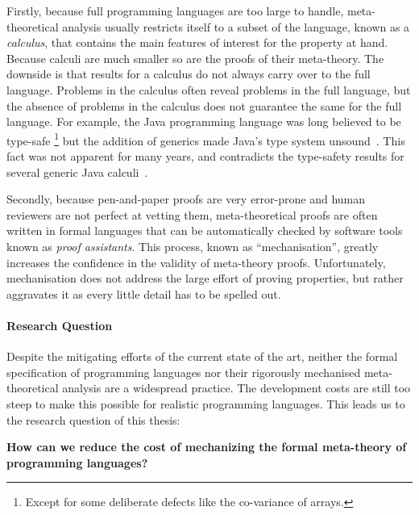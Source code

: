 {Firstly, because full programming languages are too large to handle,
meta-theoretical analysis usually restricts itself to a subset of the language, known as
a \emph{calculus}, that contains the main features of interest for the property
at hand. Because calculi are much smaller so are the proofs of their 
meta-theory. The downside is that results for a calculus do not always
carry over to the full language. Problems in the calculus often reveal
problems in the full language, but the absence of problems in the calculus
does not guarantee the same for the full language.
For example, the Java programming language was long believed to be type-safe
\footnote{Except for some deliberate defects like the co-variance of arrays.}
but the addition of generics made Java's type system
unsound~\cite{amin2016java}. This fact was not apparent for many years, and
contradicts the type-safety results for several generic Java calculi~\cite{}.

Secondly, because pen-and-paper proofs are very error-prone and human reviewers
are not perfect at vetting them, meta-theoretical proofs are often written in
formal languages that can be automatically checked by software tools known as
\emph{proof assistants}. This process, known as ``mechanisation'', greatly
increases the confidence in the validity of meta-theory proofs. Unfortunately,
mechanisation does not address the large effort of proving properties, but rather
aggravates it as every little detail has to be spelled out.

\paragraph{Research Question}
Despite the mitigating efforts of the current state of the art, neither the
formal specification of programming languages nor their rigorously mechanised
meta-theoretical analysis are a widespread practice. The development costs
are still too steep to make this possible for realistic programming languages.
This leads us to the research question of this thesis:
\begin{center}
  \begin{minipage}{0.8\columnwidth}\bf
    How can we reduce the cost of mechanizing the formal meta-theory of programming
    languages?
  \end{minipage}
\end{center}

}
